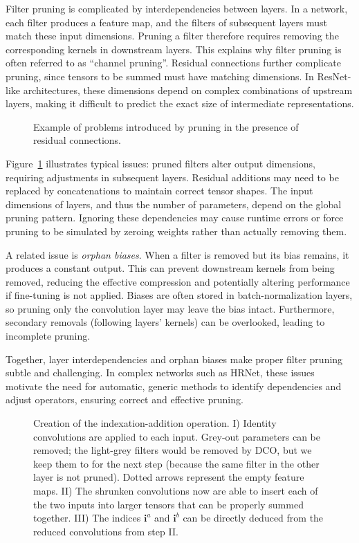 \documentclass[11pt]{report}
\begin{document}
Filter pruning is complicated by interdependencies between layers. In a network, each filter produces a feature map, and the filters of subsequent layers must match these input dimensions. Pruning a filter therefore requires removing the corresponding kernels in downstream layers. This explains why filter pruning is often referred to as ``channel pruning''. Residual connections further complicate pruning, since tensors to be summed must have matching dimensions. In ResNet-like architectures, these dimensions depend on complex combinations of upstream layers, making it difficult to predict the exact size of intermediate representations.

\begin{figure}[ht]
  \centering
  
  \caption{Example of problems introduced by pruning in the presence of residual connections.}
  \label{fig:pruning_problems}
\end{figure}

Figure~\ref{fig:pruning_problems} illustrates typical issues: pruned filters alter output dimensions, requiring adjustments in subsequent layers. Residual additions may need to be replaced by concatenations to maintain correct tensor shapes. The input dimensions of layers, and thus the number of parameters, depend on the global pruning pattern. Ignoring these dependencies may cause runtime errors or force pruning to be simulated by zeroing weights rather than actually removing them.

A related issue is \emph{orphan biases}. When a filter is removed but its bias remains, it produces a constant output. This can prevent downstream kernels from being removed, reducing the effective compression and potentially altering performance if fine-tuning is not applied. Biases are often stored in batch-normalization layers, so pruning only the convolution layer may leave the bias intact. Furthermore, secondary removals (following layers’ kernels) can be overlooked, leading to incomplete pruning.

Together, layer interdependencies and orphan biases make proper filter pruning subtle and challenging. In complex networks such as HRNet, these issues motivate the need for automatic, generic methods to identify dependencies and adjust operators, ensuring correct and effective pruning.

\begin{figure}[htp]
  \centering
  
  \caption{Creation of the indexation-addition operation. I) Identity convolutions are applied to each input. Grey-out parameters can be removed; the light-grey filters would be removed by DCO, but we keep them to for the next step (because the same filter in the other layer is not pruned). Dotted arrows represent the empty feature maps. II) The shrunken convolutions now are able to insert each of the two inputs into larger tensors that can be properly summed together. III) The indices $\mathbf{i}^a$ and $\mathbf{i}^b$ can be directly deduced from the reduced convolutions from step II.}
  \label{fig:crossbar_trick}
\end{figure}
\end{document}
